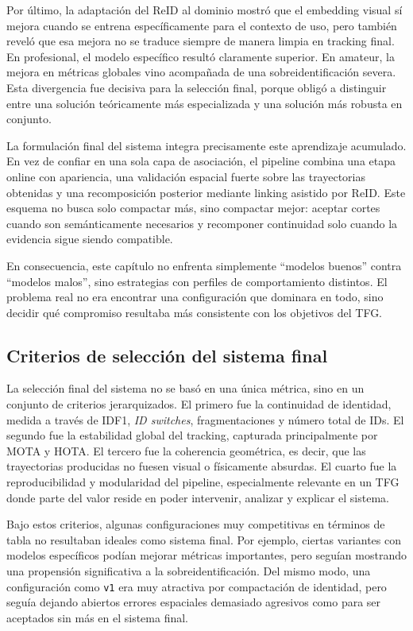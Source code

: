 \documentclass[../MAIN.tex]{subfiles}
\begin{document}
	Por último, la adaptación del ReID al dominio mostró que el embedding visual sí mejora cuando se entrena específicamente para el contexto de uso, pero también reveló que esa mejora no se traduce siempre de manera limpia en tracking final. En profesional, el modelo específico resultó claramente superior. En amateur, la mejora en métricas globales vino acompañada de una sobreidentificación severa. Esta divergencia fue decisiva para la selección final, porque obligó a distinguir entre una solución teóricamente más especializada y una solución más robusta en conjunto.
	
	La formulación final del sistema integra precisamente este aprendizaje acumulado. En vez de confiar en una sola capa de asociación, el pipeline combina una etapa online con apariencia, una validación espacial fuerte sobre las trayectorias obtenidas y una recomposición posterior mediante linking asistido por ReID. Este esquema no busca solo compactar más, sino compactar mejor: aceptar cortes cuando son semánticamente necesarios y recomponer continuidad solo cuando la evidencia sigue siendo compatible.
	
	En consecuencia, este capítulo no enfrenta simplemente “modelos buenos” contra “modelos malos”, sino estrategias con perfiles de comportamiento distintos. El problema real no era encontrar una configuración que dominara en todo, sino decidir qué compromiso resultaba más consistente con los objetivos del TFG.
	
	\subsection{Criterios de selección del sistema final}
	
	La selección final del sistema no se basó en una única métrica, sino en un conjunto de criterios jerarquizados. El primero fue la continuidad de identidad, medida a través de IDF1, \textit{ID switches}, fragmentaciones y número total de IDs. El segundo fue la estabilidad global del tracking, capturada principalmente por MOTA y HOTA. El tercero fue la coherencia geométrica, es decir, que las trayectorias producidas no fuesen visual o físicamente absurdas. El cuarto fue la reproducibilidad y modularidad del pipeline, especialmente relevante en un TFG donde parte del valor reside en poder intervenir, analizar y explicar el sistema.
	
	Bajo estos criterios, algunas configuraciones muy competitivas en términos de tabla no resultaban ideales como sistema final. Por ejemplo, ciertas variantes con modelos específicos podían mejorar métricas importantes, pero seguían mostrando una propensión significativa a la sobreidentificación. Del mismo modo, una configuración como \texttt{v1} era muy atractiva por compactación de identidad, pero seguía dejando abiertos errores espaciales demasiado agresivos como para ser aceptados sin más en el sistema final.
	
\end{document}
